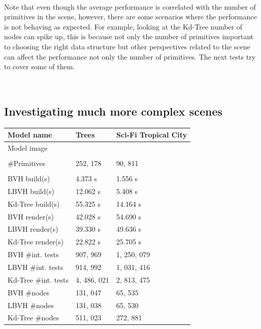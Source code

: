 \documentclass[11pt,a4paper]{article}
\newcommand\Includegraphics[2][]{\sbox{\mybox}{%
\texttt{[image: \#2]}}\abovebaseline[-.5\ht\mybox]{%
\addstackgap{\usebox{\mybox}}}}
\begin{document}
\noindent
\\
Note that even though the average performance is correlated with the number of primitives in the scene, however, there are some scenarios where the performance is not behaving as expected. For example, looking at the Kd-Tree number of nodes can spike up, this is because not only the number of primitives important to choosing the right data structure but other perspectives related to the scene can affect the performance not only the number of primitives.  The next tests try to cover some of them.

\noindent
\\
\subsection{Investigating much more complex scenes}

\begin{table}[H] 
\centering 
{\footnotesize
\begin{tabular}{ P{2.5cm}||P{5cm}P{5cm} }      %
\hline\hline                                      %
Model name& Trees & Sci-Fi Tropical City   \T\B 
\\
\hline\hline 

Model image&
\Includegraphics[width=5cm]{images/tree.png}
& \Includegraphics[width=5cm]{images/SCIFI.png}
\\

\hline \hline
\\
\#Primitives & 252, 178  & 90, 811\\ [0.5ex] %
\\
\hline \hline
BVH build(s)& 4.373 s& 1.556 s\T\B
\\
LBVH build(s)& 12.062 s& 5.408 s \T\B
\\
Kd-Tree build(s)& 55.325 s& 14.164 s \T\B
\\
\hline \hline
BVH render(s)& 42.028 s& 54.690 s \T\B
\\
LBVH render(s)& 39.330 s& 49.636 s \T\B
\\
Kd-Tree render(s)& 22.822 s& 25.705 s  \T\B
\\
\hline \hline
BVH \#int. tests & 907, 969 & 1, 250, 079  \T\B
\\
LBVH \#int. tests & 914, 992 & 1, 031, 416  \T\B
\\
Kd-Tree \#int. tests & 4, 486, 021 & 2, 813, 475  \T\B
\\
\hline \hline
BVH \#nodes & 131, 047 & 65, 535 \T\B
\\
LBVH \#nodes & 131, 038 & 65, 530 \T\B
\\
Kd-Tree \#nodes & 511, 023 & 272, 881 \T\B
\\
\hline \hline

    \end{tabular}
}
\end{table}
\end{document}
